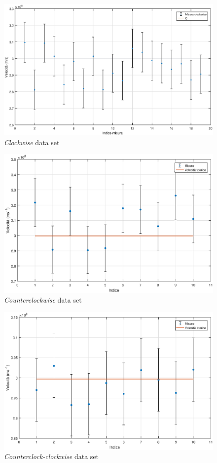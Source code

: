 \documentclass[a4paper,11pt]{article}
\begin{document}
	\begin{figure}[h]
		\centering
		\caption{\emph{Clockwise} data set}
		\includegraphics[width=.98\textwidth]{Clockwiseplot}
	\end{figure}
	

	\begin{figure}[h]
		\centering
		\caption{\emph{Counterclockwise} data set}
		\includegraphics[width=.98\textwidth]{Counterclockwiseplot}
	\end{figure}
	
	\begin{figure}[h]
		\centering
		\caption{\emph{Counterclock-clockwise} data set}
		\includegraphics[width=.98\textwidth]{Clock-anticlockplot}
	\end{figure}
	

	
	
	
	
\end{document}
